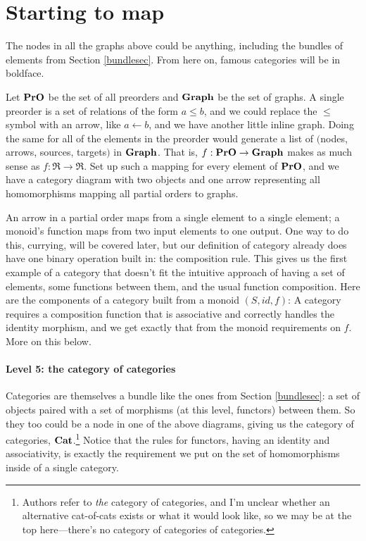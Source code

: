 \documentclass[11pt]{article}
\begin{document}
\section{Starting to map}
The nodes in all the graphs above could be anything, including the bundles of elements from
Section \ref{bundlesec}. From here on, famous categories will be in boldface.

Let ${\bf PrO}$ be the set of all preorders and ${\bf Graph}$ be the set of graphs. A
single preorder is a set of relations of the form $a \leq b$, and we could replace the $\leq$
symbol with an arrow, like $a\leftarrow b$, and we have another little inline graph. 
Doing the same for all of the elements in the preorder would generate a list of
$($nodes, arrows, sources, targets$)$ in ${\bf Graph}$.
That is, $f:{\bf PrO}\to {\bf Graph}$ makes as much sense as $f:\Re \to \Re$. Set up such
a mapping for every element of ${\bf PrO}$, and we have a category diagram with two
objects and one arrow representing all homomorphisms mapping all partial orders to graphs.

An arrow in a partial order maps from a single element to a single element; a monoid's
function maps from two input elements to one output. One way to do this, currying, will be
covered later, but our definition of category already does have one binary operation
built in: the composition rule. This gives us the first example of a category that
doesn't fit the intuitive approach of having a set of elements, some functions between
them, and the usual function composition. Here are the components of a category built
from a monoid $(S, id, f)$:
A category requires a composition function that is associative and correctly handles the
identity morphism, and we get exactly that from the monoid requirements on $f$. More on
this below.

\paragraph{Level 5: the category of categories}
Categories are themselves a bundle like the ones from Section \ref{bundlesec}: a set
of objects paired with a set of morphisms (at this level, functors) between them. So
they too could be a node in one of the above diagrams, giving us the category of
categories, ${\bf Cat}$.\footnote{Authors refer to {\em the} category of categories,
and I'm unclear whether an alternative cat-of-cats exists or what it would look like,
so we may be at the top here---there's no category of categories of categories.}
Notice that the rules for functors, having an identity and associativity, is exactly the
requirement we put on the set of homomorphisms inside of a single category.
\end{document}
